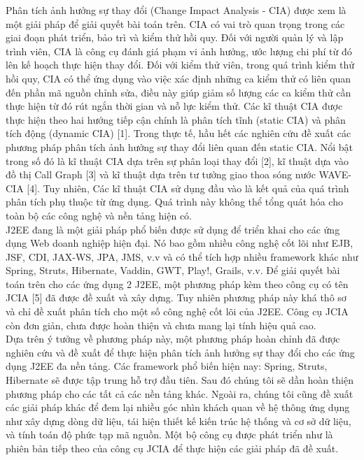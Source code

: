 \documentclass[12pt,a4paper]{report}
\begin{document}
Phân tích ảnh hưởng sự thay đổi (Change Impact Analysis - CIA) được xem là một
giải pháp để giải quyết bài toán trên. CIA có vai trò quan trọng trong các giai đoạn phát
triển, bảo trì và kiểm thử hồi quy. Đối với người quản lý và lập trình viên, CIA là công cụ
đánh giá phạm vi ảnh hưởng, ước lượng chi phí từ đó lên kế hoạch thực hiện thay đổi.
Đối với kiểm thử viên, trong quá trình kiểm thử hồi quy, CIA có thể ứng dụng vào việc
xác định những ca kiểm thử có liên quan đến phần mã nguồn chỉnh sửa, điều này giúp
giảm số lượng các ca kiểm thử cần thực hiện từ đó rút ngắn thời gian và nỗ lực kiểm thử.
Các kĩ thuật CIA được thực hiện theo hai hướng tiếp cận chính là phân tích tĩnh (static
CIA) và phân tích động (dynamic CIA) [1]. Trong thực tế, hầu hết các nghiên cứu đề xuất
các phương pháp phân tích ảnh hưởng sự thay đổi liên quan đến static CIA. Nổi bật trong
số đó là kĩ thuật CIA dựa trên sự phân loại thay đổi [2], kĩ thuật dựa vào đồ thị Call
Graph [3] và kĩ thuật dựa trên tư tưởng giao thoa sóng nước WAVE-CIA [4]. Tuy nhiên,
Các kĩ thuật CIA sử dụng đầu vào là kết quả của quá trình phân tích phụ thuộc từ ứng
dụng. Quá trình này không thể tổng quát hóa cho toàn bộ các công nghệ và nền tảng hiện
có.\\

J2EE đang là một giải pháp phổ biến được sử dụng để triển khai cho các ứng dụng
Web doanh nghiệp hiện đại. Nó bao gồm nhiều công nghệ cốt lõi như EJB, JSF, CDI,
JAX-WS, JPA, JMS, v.v và có thể tích hợp nhiều framework khác như Spring, Struts,
Hibernate, Vaddin, GWT, Play!, Grails, v.v. Để giải quyết bài toán trên cho các ứng dụng 
2
J2EE, một phương pháp kèm theo công cụ có tên JCIA [5] đã được đề xuất và xây dựng.
Tuy nhiên phương pháp này khá thô sơ và chỉ đề xuất phân tích cho một số công nghệ cốt
lõi của J2EE. Công cụ JCIA còn đơn giản, chưa được hoàn thiện và chưa mang lại tính
hiệu quả cao.\\

Dựa trên ý tưởng về phương pháp này, một phương pháp hoàn chỉnh đã được nghiên
cứu và đề xuất để thực hiện phân tích ảnh hưởng sự thay đổi cho các ứng dụng J2EE đa
nền tảng. Các framework phổ biến hiện nay: Spring, Struts, Hibernate sẽ được tập trung
hỗ trợ đầu tiên. Sau đó chúng tôi sẽ dần hoàn thiện phương pháp cho các tất cả các nền
tảng khác. Ngoài ra, chúng tôi cũng đề xuất các giải pháp khác để đem lại nhiều góc nhìn
khách quan về hệ thông ứng dụng như xây dựng dòng dữ liệu, tái hiện thiết kế kiến trúc
hệ thống và cơ sở dữ liệu, và tính toán độ phức tạp mã nguồn. Một bộ công cụ được phát
triển như là phiên bản tiếp theo của công cụ JCIA để thực hiện các giải pháp đã đề xuất.\\
\end{document}
